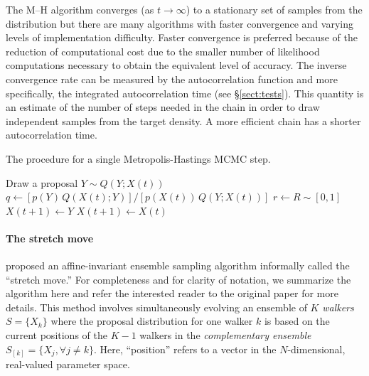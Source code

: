 \documentclass[12pt,preprint]{aastex}
\newcommand{\sect}[1]{\S\ref{sect:#1}}
\newcommand{\algolabel}[1]{\label{algo:#1}}
\newcommand{\ensemble}{S}
\renewcommand{\vector}[1]{#1}
\newcommand{\pr}[1]{\ensuremath{p(#1)}}
\begin{document}
The M--H algorithm converges (as $t \to \infty$) to a stationary set of
samples from the distribution but there are many algorithms with faster
convergence and varying levels of implementation difficulty.
Faster convergence is preferred because of the reduction of computational
cost due to the smaller number of likelihood computations necessary to obtain
the equivalent level of accuracy. The inverse convergence rate can be
measured by the autocorrelation function and more specifically, the integrated
autocorrelation time (see \sect{tests}). This quantity is an estimate of the
number of steps needed in the chain in order to draw independent samples from
the target density. A more efficient chain has a shorter
autocorrelation time.

\nonumberparagraphs

\begin{algorithm}
\caption{The procedure for a single Metropolis-Hastings MCMC step.
    \algolabel{mh}}
\begin{algorithmic}[1]

\STATE Draw a proposal $Y \sim Q (Y; X(t))$
\STATE $q \gets [\pr{\vector{Y}} \, Q(X(t); Y)]
        / [\pr{\vector{X}(t)} \, Q(Y;X(t))]$%
            \hspace{1cm}{\footnotesize\it // This line is generally expensive}
\STATE $r \gets R \sim [0, 1]$
    \STATE $\vector{X}(t+1) \gets \vector{Y}$
\ELSE
    \STATE $\vector{X}(t+1) \gets \vector{X}(t)$
\ENDIF

\end{algorithmic}
\end{algorithm}

\numberparagraphs

\paragraph{The stretch move}

 proposed an affine-invariant ensemble sampling
algorithm informally called the ``stretch move.''  For completeness and for
clarity of notation, we summarize the algorithm here and refer the interested
reader to the original paper for more details. This method involves
simultaneously evolving an ensemble of $K$ \emph{walkers}
$\ensemble = \{ \vector{X_k} \}$ where the proposal
distribution for one walker $k$ is based on the current positions of the
$K-1$ walkers in the \emph{complementary ensemble}
$\ensemble_{[k]} = \{ \vector{X_j}, \forall j \ne k \}$. Here, ``position''
refers to a vector in the $N$-dimensional, real-valued parameter space.
\end{document}
